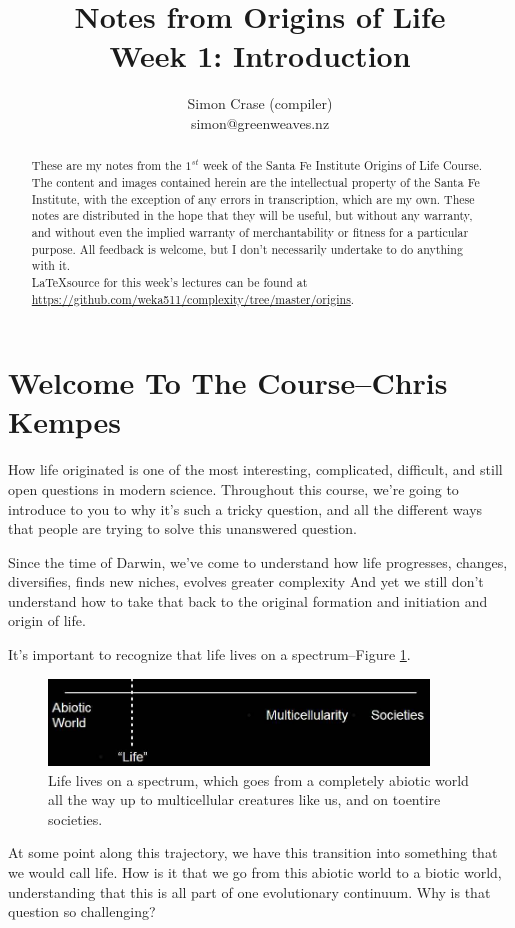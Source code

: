\documentclass[]{article}
\title{
	Notes from Origins of Life\\
	Week 1: Introduction
}
\author{Simon Crase (compiler)\\simon@greenweaves.nz}
\begin{document}
\maketitle

\begin{abstract}
    These are my notes from the $1^{st}$ week of the Santa Fe Institute Origins of Life Course\cite{sfi2020}.\\
    The content and images contained herein are the intellectual property of the Santa Fe Institute, with the exception of any errors in transcription, which are my own.
    These notes are distributed in the hope that they will be useful,
    but without any warranty, and without even the implied warranty of
     merchantability or fitness for a particular purpose. All feedback is welcome,
    but I don't necessarily undertake to do anything with it.\\
    \LaTeX source for this week's lectures can be found at\\
    \url{https://github.com/weka511/complexity/tree/master/origins}.
\end{abstract}

\setcounter{tocdepth}{2}
\tableofcontents
\listoffigures

\section[Welcome To The Course]{Welcome To The Course--Chris Kempes}

How life originated is one of the most interesting, complicated, difficult, and still open questions in modern science. Throughout this course, we're going to
introduce to you to why it's such a tricky question, and all the different ways that people are trying to solve this unanswered question.	

Since the time of Darwin, we've come to understand how life progresses, changes, diversifies, finds new niches, evolves greater complexity And yet we still don't understand how to take that back to the original formation and initiation and origin of life.

It's important to recognize that life lives on a spectrum--Figure \ref{fig:lifesTransitions}.

\begin{figure}[H]
	\caption[Life lives on a spectrum]{Life lives on a spectrum, which goes from a completely abiotic world
		all the way up to multicellular creatures like us, and on toentire societies.}\label{fig:lifesTransitions}
	\includegraphics[width=0.9\textwidth]{lifesTransitions}
\end{figure}
At some point along this trajectory, we have this transition into something
that we would call life. How is it that we go from this
abiotic world to a biotic world, understanding that this is all part of one
evolutionary continuum. Why is that question so challenging?
\end{document}
